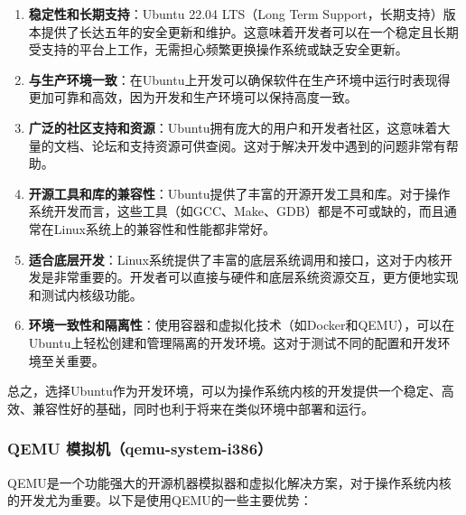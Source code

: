\begin{enumerate}
    \item \textbf{稳定性和长期支持}：Ubuntu 22.04 LTS（Long Term Support，长期支持）版本提供了长达五年的安全更新和维护。这意味着开发者可以在一个稳定且长期受支持的平台上工作，无需担心频繁更换操作系统或缺乏安全更新。
    \item \textbf{与生产环境一致}：在Ubuntu上开发可以确保软件在生产环境中运行时表现得更加可靠和高效，因为开发和生产环境可以保持高度一致。
    \item \textbf{广泛的社区支持和资源}：Ubuntu拥有庞大的用户和开发者社区，这意味着大量的文档、论坛和支持资源可供查阅。这对于解决开发中遇到的问题非常有帮助。
    \item \textbf{开源工具和库的兼容性}：Ubuntu提供了丰富的开源开发工具和库。对于操作系统开发而言，这些工具（如GCC、Make、GDB）都是不可或缺的，而且通常在Linux系统上的兼容性和性能都非常好。
    \item \textbf{适合底层开发}：Linux系统提供了丰富的底层系统调用和接口，这对于内核开发是非常重要的。开发者可以直接与硬件和底层系统资源交互，更方便地实现和测试内核级功能。
    \item \textbf{环境一致性和隔离性}：使用容器和虚拟化技术（如Docker和QEMU），可以在Ubuntu上轻松创建和管理隔离的开发环境。这对于测试不同的配置和开发环境至关重要。
\end{enumerate}

总之，选择Ubuntu作为开发环境，可以为操作系统内核的开发提供一个稳定、高效、兼容性好的基础，同时也利于将来在类似环境中部署和运行。

\subsubsection{QEMU 模拟机（qemu-system-i386）}

QEMU是一个功能强大的开源机器模拟器和虚拟化解决方案，对于操作系统内核的开发尤为重要。以下是使用QEMU的一些主要优势：


